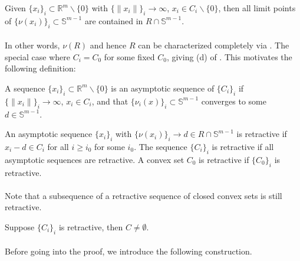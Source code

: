\begin{prop}
	\label{prop:013-construction-recession}
	Given $\{x_i\}_i\subset \mathbb{R}^m\smallsetminus \{0\}$ with $\{\|x_i\|\}_i\to\infty$, $x_i\in C_i\smallsetminus \{0\}$, then all limit points of $\{\nu(x_i)\}_i\subset \mathbb{S}^{m-1}$ are contained in $R\cap \mathbb{S}^{m-1}$.
\end{prop}

\paragraph{}In other words, $\nu(R)$ and hence $R$ can be characterized completely via . The special case where $C_i=C_0$ for some fixed $C_0$, giving (d) of . This motivates the following definition:

\begin{prop}
	\label{defn:013-asymptotic}
	A sequence $\{x_i\}_i\subset \mathbb{R}^m\smallsetminus\{0\}$ is an asymptotic sequence of $\{C_i\}_i$ if $\{\|x_i\|\}_i\to\infty$, $x_i\in C_i$, and that $\{\nu_i(x)\}_i\subset \mathbb{S}^{m-1}$ converges to some $d\in \mathbb{S}^{m-1}$.
\end{prop}

\begin{defn}[Retractiveness]
	\label{defn:013-retractiveness}
	An asymptotic sequence $\{x_i\}_i$ with $\{\nu(x_i)\}_i\to d\in R\cap \mathbb{S}^{m-1}$ is retractive if $x_i-d\in C_i$ for all $i\geq i_0$ for some $i_0$. The sequence $\{C_i\}_i$ is retractive if all asymptotic sequences are retractive. A convex set $C_0$ is retractive if $\{C_0\}_i$ is retractive.
\end{defn}

\paragraph{}Note that a subsequence of a retractive sequence of closed convex sets is still retractive.

\begin{prop}
	\label{prop:013-non-empt-I}
	Suppose $\{C_i\}_i$ is retractive, then $C\neq\emptyset$.
\end{prop}

\paragraph{}Before going into the proof, we introduce the following construction.

